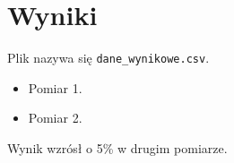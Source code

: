 \documentclass[a4paper,11pt]{article}
\begin{document}
\section{Wyniki}
Plik nazywa się \texttt{dane\_wynikowe.csv}.
\begin{itemize}
  \item Pomiar 1.
  \item Pomiar 2.
\end{itemize}
Wynik wzrósł o 5\% w drugim pomiarze.
\end{document}
